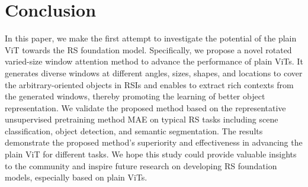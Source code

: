 \documentclass[10pt, journal,twoside]{IEEEtran}
\begin{document}
\section{Conclusion}
In this paper, we make the first attempt to investigate the potential of the plain ViT towards the RS foundation model. Specifically, we propose a novel rotated varied-size window attention method to advance the performance of plain ViTs. It generates diverse windows at different angles, sizes, shapes, and locations to cover the arbitrary-oriented objects in RSIs and enables to extract rich contexts from the generated windows, thereby promoting the learning of better object representation. We validate the proposed method based on the representative unsupervised pretraining method MAE on typical RS tasks including scene classification, object detection, and semantic segmentation. The results demonstrate the proposed method's superiority and effectiveness in advancing the plain ViT for different tasks. We hope this study could provide valuable insights to the community and inspire future research on developing RS foundation models, especially based on plain ViTs.















































\ifCLASSOPTIONcaptionsoff
  \newpage
\fi








\normalem

\end{document}
